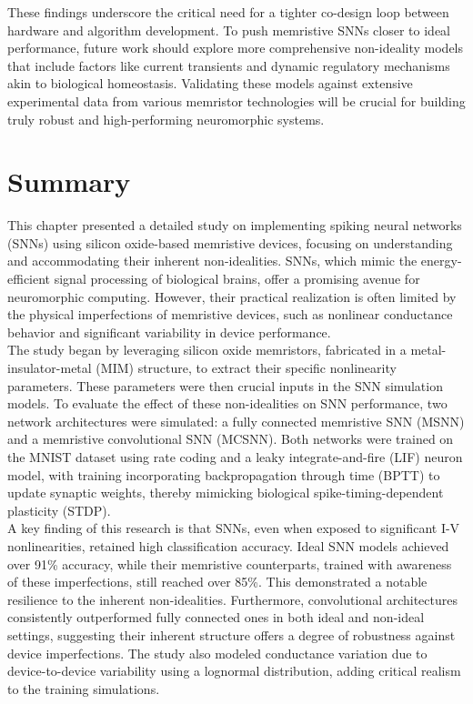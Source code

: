 \noindent These findings underscore the critical need for a tighter co-design loop between hardware and algorithm development. To push memristive SNNs closer to ideal performance, future work should explore more comprehensive non-ideality models that include factors like current transients and dynamic regulatory mechanisms akin to biological homeostasis. Validating these models against extensive experimental data from various memristor technologies will be crucial for building truly robust and high-performing neuromorphic systems.

\section[Summary]{Summary}

This chapter presented a detailed study on implementing spiking neural networks (SNNs) using silicon oxide-based memristive devices, focusing on understanding and accommodating their inherent non-idealities. SNNs, which mimic the energy-efficient signal processing of biological brains, offer a promising avenue for neuromorphic computing. However, their practical realization is often limited by the physical imperfections of memristive devices, such as nonlinear conductance behavior and significant variability in device performance.\\

\noindent The study began by leveraging silicon oxide memristors, fabricated in a metal-insulator-metal (MIM) structure, to extract their specific nonlinearity parameters. These parameters were then crucial inputs in the SNN simulation models. To evaluate the effect of these non-idealities on SNN performance, two network architectures were simulated: a fully connected memristive SNN (MSNN) and a memristive convolutional SNN (MCSNN). Both networks were trained on the MNIST dataset using rate coding and a leaky integrate-and-fire (LIF) neuron model, with training incorporating backpropagation through time (BPTT) to update synaptic weights, thereby mimicking biological spike-timing-dependent plasticity (STDP). \\

\noindent A key finding of this research is that SNNs, even when exposed to significant I-V nonlinearities, retained high classification accuracy. Ideal SNN models achieved over 91\% accuracy, while their memristive counterparts, trained with awareness of these imperfections, still reached over 85\%. This demonstrated a notable resilience to the inherent non-idealities. Furthermore, convolutional architectures consistently outperformed fully connected ones in both ideal and non-ideal settings, suggesting their inherent structure offers a degree of robustness against device imperfections. The study also modeled conductance variation due to device-to-device variability using a lognormal distribution, adding critical realism to the training simulations.\\

